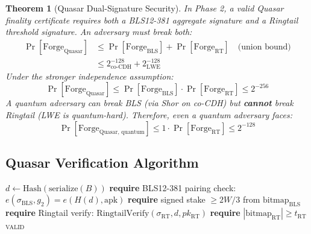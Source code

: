 \documentclass[11pt]{article}
\newtheorem{theorem}{Theorem}
\begin{document}
\begin{theorem}[Quasar Dual-Signature Security]
In Phase 2, a valid Quasar finality certificate requires both a BLS12-381 aggregate signature and a Ringtail threshold signature. An adversary must break both:
\begin{align}
\Pr[\text{Forge}_{\text{Quasar}}] &\leq \Pr[\text{Forge}_{\text{BLS}}] + \Pr[\text{Forge}_{\text{RT}}] \quad \text{(union bound)} \\
&\leq 2^{-128}_{\text{co-CDH}} + 2^{-128}_{\text{LWE}}
\end{align}
Under the stronger independence assumption:
\begin{equation}
\Pr[\text{Forge}_{\text{Quasar}}] \leq \Pr[\text{Forge}_{\text{BLS}}] \cdot \Pr[\text{Forge}_{\text{RT}}] \leq 2^{-256}
\end{equation}
A quantum adversary can break BLS (via Shor on co-CDH) but \textbf{cannot} break Ringtail (LWE is quantum-hard). Therefore, even a quantum adversary faces:
\begin{equation}
\Pr[\text{Forge}_{\text{Quasar, quantum}}] \leq 1 \cdot \Pr[\text{Forge}_{\text{RT}}] \leq 2^{-128}
\end{equation}
\end{theorem}

\subsection{Quasar Verification Algorithm}

\begin{algorithm}[H]
\caption{Quasar Hybrid Finality Verification}
\begin{algorithmic}[1]
    \State $d \gets \text{Hash}(\text{serialize}(B))$
        \State \textbf{require} BLS12-381 pairing check: $e(\sigma_{\text{BLS}}, g_2) = e(H(d), \text{apk})$
        \State \textbf{require} signed stake $\geq 2W/3$ from $\text{bitmap}_{\text{BLS}}$
    \EndIf
        \State \textbf{require} Ringtail verify: $\text{RingtailVerify}(\sigma_{\text{RT}}, d, pk_{\text{RT}})$
        \State \textbf{require} $|\text{bitmap}_{\text{RT}}| \geq t_{\text{RT}}$
    \EndIf
    \State \Return \textsc{valid}
\EndFunction
\end{algorithmic}
\end{algorithm}

\end{document}
